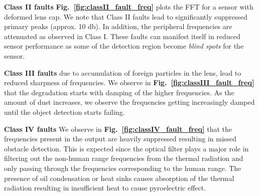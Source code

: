 \textbf{Class II faults} %
\textbf{Fig.~\ref{fig:classII_fault_freq}} plots the FFT for a sensor with deformed lens cap. 
We note that Class II faults lead to significantly suppressed primary peaks (approx. 10 db). In addition, the peripheral frequencies are attenuated as observed in Class I. These faults can manifest itself in reduced sensor performance as some of the detection region become \textit{blind spots} for the sensor.


\textbf{Class III faults} due to accumulation of foreign particles in the lens, lead to reduced sharpness of frequencies.
We observe in \textbf{Fig.~\ref{fig:classIII_fault_freq}} that the degradation starts with damping of the higher frequencies. As the amount of dust increases, we observe the frequencies getting increasingly damped until the object detection starts failing.


\textbf{Class IV faults}
We observe in \textbf{Fig.~\ref{fig:classIV_fault_freq}} that the frequencies present in the output are heavily suppressed resulting in missed obstacle detection. This is expected since the optical filter plays a major role in filtering out the non-human range frequencies from the thermal radiation and only passing through the frequencies corresponding to the human range. The presence of oil condensation or heat sinks causes absorption of the thermal radiation resulting in insufficient heat to cause pyroelectric effect. 

